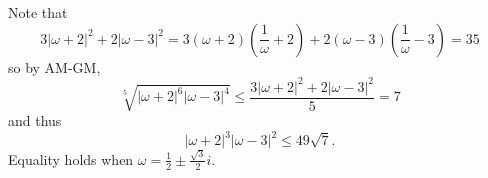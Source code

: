 Note that \[3\left|\omega+2\right|^2+2\left|\omega-3\right|^2=3\left(\omega+2\right)\left(\frac{1}{\omega}+2\right)+2\left(\omega-3\right)\left(\frac{1}{\omega}-3\right)=35\] so by AM-GM, \[\sqrt[5]{\left|\omega+2\right|^6\left|\omega-3\right|^4}\leq\frac{3\left|\omega+2\right|^2+2\left|\omega-3\right|^2}{5}=7\] and thus \[\left|\omega+2\right|^3\left|\omega-3\right|^2\leq49\sqrt{7}.\] Equality holds when $\omega=\frac{1}{2}\pm\frac{\sqrt{3}}{2}i$.